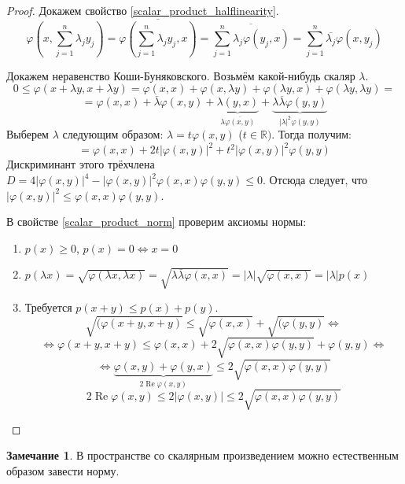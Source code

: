 \documentclass[11pt,openany,a4paper]{scrartcl}
\theoremstyle{plain}
\theoremstyle{definition}
\newtheorem{remark}[theorem]{Замечание}
\newcommand\mb{\mathbb}
\newcommand\real{\mb R}
\newcommand\ol{\overline}
\DeclareMathOperator{\Ree}{Re}
\begin{document}
\begin{proof}
    Докажем свойство \ref{scalar_product_halflinearity}.
    $$
    \varphi(x, \sum\limits_{j=1}^n \lambda_j y_j) =
    \ol{\varphi(\sum\limits_{j=1}^n \lambda_j y_j, x)} =
    \ol{\sum\limits_{j=1}^n\lambda_j \varphi(y_j, x)} =
    \sum\limits_{j=1}^n \ol{\lambda_j}\varphi(x, y_j)
    $$
    
    Докажем неравенство Коши-Буняковского. Возьмём какой-нибудь скаляр $\lambda$.
    $$
    0 \leqslant \varphi(x + \lambda y, x + \lambda y) = \varphi(x, x) +
    \varphi(x, \lambda y) + \varphi(\lambda y, x) +
    \varphi(\lambda y, \lambda y) =
    $$
    $$
    = \varphi(x, x) + \ol\lambda\varphi(x, y) +
    \underbrace{\lambda(y, x)}_{\lambda\ol{\varphi(x, y)}} +
    \underbrace{\lambda\ol\lambda\varphi(y, y)}_{|\lambda|^2\varphi(y, y)}
    $$
    Выберем $\lambda$ следующим образом:
    $\lambda = t\varphi(x, y)$ ($t \in \real)$. Тогда получим:
    $$
    = \varphi(x, x) + 2t|\varphi(x, y)|^2 + t^2|\varphi(x, y)|^2\varphi(y, y)
    $$
    Дискриминант этого трёхчлена $D = 4|\varphi(x, y)|^4 -
    |\varphi(x, y)|^2 \varphi(x, x)\varphi(y, y) \leqslant 0$. Отсюда следует,
    что $|\varphi(x, y)|^2 \leqslant \varphi(x, x)\varphi(y, y)$.
    
    В свойстве \ref{scalar_product_norm} проверим аксиомы нормы:
    \begin{enumerate}
        \item $p(x) \geqslant 0$, $p(x) = 0 \iff x = 0$
        \item $p(\lambda x) = \sqrt{\varphi(\lambda x, \lambda x)} =
        \sqrt{\lambda\ol\lambda\varphi(x, x)} = |\lambda|\sqrt{\varphi(x, x)} =
        |\lambda|p(x)$
        \item Требуется $p(x + y) \leqslant p(x) + p(y)$.
        $$
        \sqrt{(\varphi(x + y, x + y)} \leqslant \sqrt{\varphi(x, x)} +
        \sqrt{(\varphi(y, y)} \iff
        $$
        $$
        \iff \varphi(x + y, x + y) \leqslant \varphi(x, x) +
        2\sqrt{\varphi(x, x)\varphi(y, y)} + \varphi(y, y) \iff
        $$
        $$
        \iff \underbrace{\varphi(x, y) + \varphi(y, x)}_{2\Ree\varphi(x, y)}
        \leqslant 2\sqrt{\varphi(x, x)\varphi(y, y)}
        $$
        $$
        2\Ree \varphi(x, y) \leqslant 2|\varphi(x, y)| \leqslant
        2\sqrt{\varphi(x, x) \varphi(y, y)}
        $$
    \end{enumerate}
\end{proof}
\begin{remark}
    В пространстве со скалярным произведением можно естественным образом завести 
    норму.
\end{remark}
\end{document}
